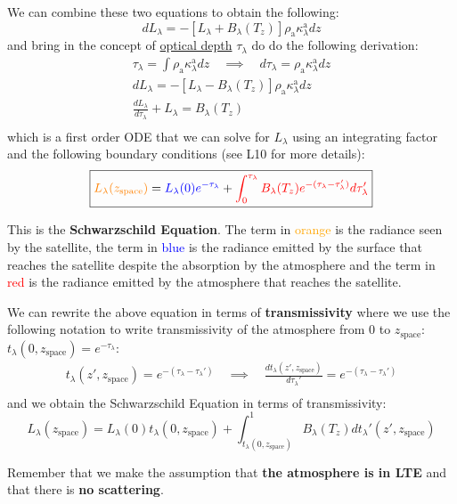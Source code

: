 We can combine these two equations to obtain the following:
$$
dL_{\lambda} = -[L_\lambda + B_\lambda(T_z)] \rho_{\text{a}} 
\kappa_\lambda^{\text{a}} dz
$$
and bring in the concept of \hyperlink{glo:opticaldepth}{optical depth} 
$\tau_\lambda$ do do the following derivation:
\begin{gather*}
    \tau_\lambda = \int \rho_{\text{a}} \kappa_\lambda^{\text{a}} dz \quad 
    \implies \quad d\tau_\lambda = \rho_{\text{a}} \kappa_\lambda^{\text{a}} dz\\
    dL_{\lambda} = -[L_\lambda - B_\lambda(T_z)] \rho_{\text{a}} 
    \kappa_\lambda^{\text{a}} dz\\
    \frac{dL_{\lambda}}{d\tau_\lambda} + L_\lambda = B_\lambda(T_z)\\
\end{gather*}
which is a first order ODE that we can solve for $L_\lambda$ using an 
integrating factor and the following boundary conditions (see L10 for more 
details):
$$
\boxed{
\textcolor{orange}{L_\lambda(z_{\text{space}})} = 
\textcolor{blue}{L_\lambda(0)e^{-\tau_\lambda}} + 
\textcolor{red}{\int_0^{\tau_\lambda}B_\lambda(T_z) 
e^{-(\tau_\lambda - \tau_\lambda')} d\tau_\lambda'}}
$$

This is the \textbf{Schwarzschild Equation}. The term in \textcolor{orange}{orange}
is the radiance seen by the satellite, the term in \textcolor{blue}{blue} is the
radiance emitted by the surface that reaches the satellite despite the absorption
by the atmosphere and the term in \textcolor{red}{red} is the radiance emitted
by the atmosphere that reaches the satellite.

We can rewrite the above equation in terms of \textbf{\gls{transmissivity}} where
we use the following notation to write transmissivity of the atmosphere from 0
to $z_{\text{space}}$: $t_\lambda (0, z_{\text{space}}) = e^{-\tau_\lambda}$:
\begin{gather*}
    t_\lambda(z', z_{\text{space}}) = e^{-(\tau_\lambda - \tau_\lambda')} \quad
    \implies \quad \frac{dt_\lambda(z', z_{\text{space}})}{d\tau_\lambda'} =
    e^{-(\tau_\lambda - \tau_\lambda')}\\
\end{gather*}
and we obtain the Schwarzschild Equation in terms of transmissivity:
$$
\boxed{
    L_\lambda(z_{\text{space}}) = L_\lambda(0) t_\lambda(0, z_{\text{space}}) +
    \int_{t_\lambda(0, z_{\text{space}})}^1 B_\lambda(T_z) 
    dt_\lambda' (z', z_{\text{space}})
}
$$

Remember that we make the assumption that \textbf{the atmosphere is in \gls{LTE}}
and that there is \textbf{no scattering}.


